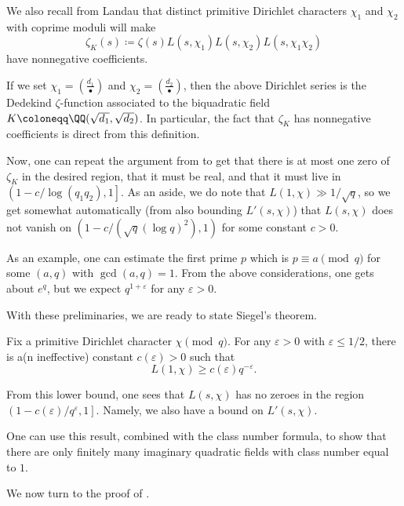 \documentclass[../notes.tex]{subfiles}
\begin{document}
We also recall from Landau that distinct primitive Dirichlet characters $\chi_1$ and $\chi_2$ with coprime moduli will make
\[\zeta_K(s)\coloneqq\zeta(s)L(s,\chi_1)L(s,\chi_2)L(s,\chi_1\chi_2)\]
have nonnegative coefficients.
\begin{remark}
	If we set $\chi_1=\left(\frac{d_1}\bullet\right)$ and $\chi_2=\left(\frac{d_2}\bullet\right)$, then the above Dirichlet series is the Dedekind $\zeta$-function associated to the biquadratic field $K\coloneqq\QQ(\sqrt{d_1},\sqrt{d_2})$. In particular, the fact that $\zeta_K$ has nonnegative coefficients is direct from this definition.
\end{remark}
Now, one can repeat the argument from  to get that there is at most one zero of $\zeta_K$ in the desired region, that it must be real, and that it must live in $\left(1-c/\log(q_1q_2),1\right]$. As an aside, we do note that $L(1,\chi)\gg1/\sqrt q$, so we get somewhat automatically (from also bounding $L'(s,\chi)$) that $L(s,\chi)$ does not vanish on $\left(1-c/(\sqrt q(\log q)^2),1\right)$ for some constant $c>0$.
\begin{remark}
	As an example, one can estimate the first prime $p$ which is $p\equiv a\pmod q$ for some $(a,q)$ with $\gcd(a,q)=1$. From the above considerations, one gets about $e^q$, but we expect $q^{1+\varepsilon}$ for any $\varepsilon>0$.
\end{remark}
With these preliminaries, we are ready to state Siegel's theorem.
\begin{theorem}[Siegel] \label{thm:siegel}
	Fix a primitive Dirichlet character $\chi\pmod q$. For any $\varepsilon>0$ with $\varepsilon\le1/2$, there is a(n ineffective) constant $c(\varepsilon)>0$ such that
	\[L(1,\chi)\ge c(\varepsilon)q^{-\varepsilon}.\]
\end{theorem}
\begin{remark}
	From this lower bound, one sees that $L(s,\chi)$ has no zeroes in the region $\left(1-c(\varepsilon)/q^\varepsilon,1\right]$. Namely, we also have a bound on $L'(s,\chi)$.
\end{remark}
\begin{remark}
	One can use this result, combined with the class number formula, to show that there are only finitely many imaginary quadratic fields with class number equal to $1$.
\end{remark}
We now turn to the proof of .
\end{document}
